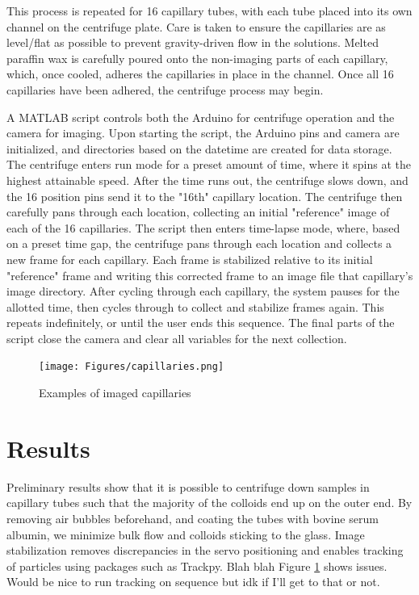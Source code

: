 This process is repeated for 16 capillary tubes, with each tube placed into its own channel on the centrifuge plate. Care is taken to ensure the capillaries are as level/flat as possible to prevent gravity-driven flow in the solutions. Melted paraffin wax is carefully poured onto the non-imaging parts of each capillary, which, once cooled, adheres the capillaries in place in the channel. Once all 16 capillaries have been adhered, the centrifuge process may begin.

A MATLAB script controls both the Arduino for centrifuge operation and the camera for imaging. Upon starting the script, the Arduino pins and camera are initialized, and directories based on the datetime are created for data storage. The centrifuge enters run mode for a preset amount of time, where it spins at the highest attainable speed. After the time runs out, the centrifuge slows down, and the 16 position pins send it to the "16th" capillary location. The centrifuge then carefully pans through each location, collecting an initial "reference" image of each of the 16 capillaries. The script then enters time-lapse mode, where, based on a preset time gap, the centrifuge pans through each location and collects a new frame for each capillary. Each frame is stabilized relative to its initial "reference" frame and writing this corrected frame to an image file that capillary's image directory. After cycling through each capillary, the system pauses for the allotted time, then cycles through to collect and stabilize frames again. This repeats indefinitely, or until the user ends this sequence. The final parts of the script close the camera and clear all variables for the next collection.
 
\begin{figure}[htp]
\begin{center}
\texttt{[image: Figures/capillaries.png]}
\caption{\label{fig:caps} Examples of imaged capillaries}
\end{center}
\end{figure}

\section{Results}
Preliminary results show that it is possible to centrifuge down samples in capillary tubes such that the majority of the colloids end up on the outer end. By removing air bubbles beforehand, and coating the tubes with bovine serum albumin, we minimize bulk flow and colloids sticking to the glass. Image stabilization removes discrepancies in the servo positioning and enables tracking of particles using packages such as Trackpy. Blah blah Figure \ref{fig:caps} shows issues. Would be nice to run tracking on sequence but idk if I'll get to that or not.

